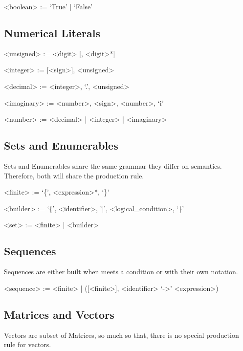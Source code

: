 \documentclass[11pt,a4paper]{book}
\begin{document}
\begin{grammar}
<boolean> := `True' | `False'
\end{grammar}

\subsection{Numerical Literals}

\begin{grammar}

<unsigned> := <digit> [, <digit>*]

<integer> := [<sign>], <unsigned>

<decimal> := <integer>, `.', <unsigned>

<imaginary> := <number>, <sign>, <number>, `i'

<number> := <decimal> | <integer> | <imaginary>
\end{grammar}

\subsection{Sets and Enumerables}

Sets and Enumerables share the same grammar they differ on semantics. Therefore, both will share the  production rule.

\begin{grammar}
<finite> := `\{', <expression>*, `\}'

<builder> := `\{', <identifier>, '|', <logical\_condition>, `\}'

<set> := <finite> | <builder>
\end{grammar}

\subsection{Sequences}

Sequences are either built when  meets a condition or with their own notation.

\begin{grammar}
<sequence> := <finite> | ([<finite>], <identifier> `->' <expression>)
\end{grammar}

\subsection{Matrices and Vectors}

Vectors are subset of Matrices, so much so that, there is no special production rule for vectors.
\end{document}
